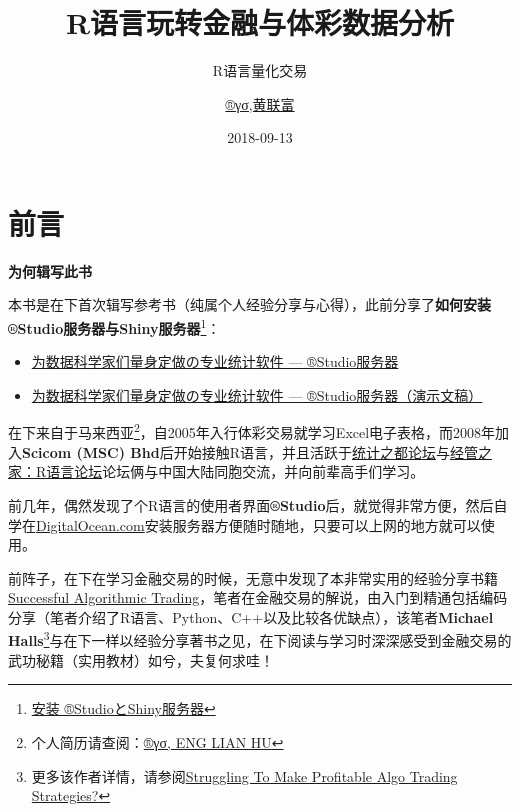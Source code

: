 \documentclass[]{book}
\title{R语言玩转金融与体彩数据分析}
\subtitle{R语言量化交易}
\author{\href{https://beta.rstudioconnect.com/content/3091/ryo-eng.html}{®γσ,黄联富}}
\date{2018-09-13}
\providecommand{\tightlist}{%
  \setlength{\itemsep}{0pt}\setlength{\parskip}{0pt}}
\let\rmarkdownfootnote\footnote%
\def\footnote{\protect\rmarkdownfootnote}
\theoremstyle{definition}
\theoremstyle{definition}
\theoremstyle{definition}
\theoremstyle{remark}
\begin{document}
\maketitle

{
\setcounter{tocdepth}{1}
\tableofcontents
}
\hypertarget{preface}{%
\chapter{前言}\label{preface}}

\textbf{为何辑写此书}

本书是在下首次辑写参考书（纯属个人经验分享与心得），此前分享了\textbf{如何安装®Studio服务器与Shiny服务器}\footnote{\href{https://github.com/scibrokes/setup-rstudio-server}{安装
  ®StudioとShiny服务器}}：

\begin{itemize}
\tightlist
\item
  \href{https://beta.rstudioconnect.com/englianhu/Introducing-RStudio-Server-for-Data-Scientists/Introducing-RStudio-Server-for-Data-Scientists.html}{为数据科学家们量身定做の专业统计软件
  --- ®Studio服务器}
\item
  \href{https://beta.rstudioconnect.com/englianhu/Introducing-RStudio-Server-for-Data-Scientists-Slides/Introducing-RStudio-Server-for-Data-Scientists-slides.html}{为数据科学家们量身定做の专业统计软件
  --- ®Studio服务器（演示文稿）}
\end{itemize}

在下来自于马来西亚\footnote{个人简历请查阅：\href{https://beta.rstudioconnect.com/content/3091/ryo-eng.html}{®γσ,
  ENG LIAN HU}}，自2005年入行体彩交易就学习Excel电子表格，而2008年加入\textbf{Scicom
(MSC)
Bhd}后开始接触R语言，并且活跃于\href{https://d.cosx.org}{统计之都论坛}与\href{http://bbs.pinggu.org/forum-69-1.html}{经管之家：R语言论坛}论坛俩与中国大陆同胞交流，并向前辈高手们学习。

前几年，偶然发现了个R语言的使用者界面\textbf{®Studio}后，就觉得非常方便，然后自学在\href{https://m.do.co/c/aabb124120d0}{DigitalOcean.com}安装服务器方便随时随地，只要可以上网的地方就可以使用。

前阵子，在下在学习金融交易的时候，无意中发现了本非常实用的经验分享书籍\href{https://raw.githubusercontent.com/englianhu/binary.com-interview-question/master/reference/Successful\%20Algorithmic\%20Trading.pdf}{Successful
Algorithmic
Trading}，笔者在金融交易的解说，由入门到精通包括编码分享（笔者介绍了R语言、Python、C++以及比较各优缺点），该笔者\textbf{Michael
Halls}\footnote{更多该作者详情，请参阅\href{https://www.quantstart.com/successful-algorithmic-trading-ebook}{Struggling
  To Make Profitable Algo Trading Strategies?}}与在下一样以经验分享著书之见，在下阅读与学习时深深感受到金融交易的武功秘籍（实用教材）如兮，夫复何求哇！
\end{document}
